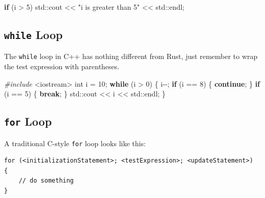 \documentclass[
]{book}
\newenvironment{Shaded}{\begin{snugshade}}{\end{snugshade}}
\newcommand{\BuiltInTok}[1]{#1}
\newcommand{\ControlFlowTok}[1]{\textcolor[rgb]{0.13,0.29,0.53}{\textbf{#1}}}
\newcommand{\DataTypeTok}[1]{\textcolor[rgb]{0.13,0.29,0.53}{#1}}
\newcommand{\DecValTok}[1]{\textcolor[rgb]{0.00,0.00,0.81}{#1}}
\newcommand{\ImportTok}[1]{#1}
\newcommand{\NormalTok}[1]{#1}
\newcommand{\PreprocessorTok}[1]{\textcolor[rgb]{0.56,0.35,0.01}{\textit{#1}}}
\newcommand{\StringTok}[1]{\textcolor[rgb]{0.31,0.60,0.02}{#1}}
\begin{document}
\begin{Shaded}
\begin{Highlighting}[]
\ControlFlowTok{if}\NormalTok{ (i \textgreater{} }\DecValTok{5}\NormalTok{)}
    \BuiltInTok{std::}\NormalTok{cout \textless{}\textless{} }\StringTok{"i is greater than 5"}\NormalTok{ \textless{}\textless{} }\BuiltInTok{std::}\NormalTok{endl;}
\end{Highlighting}
\end{Shaded}

\hypertarget{while-loop}{%
\subsection{\texorpdfstring{\texttt{while} Loop}{while Loop}}\label{while-loop}}

The \texttt{while} loop in C++ has nothing different from Rust, just remember to wrap the test expression with parentheses.

\begin{Shaded}
\begin{Highlighting}[]
\PreprocessorTok{\#include }\ImportTok{\textless{}iostream\textgreater{}}
\DataTypeTok{int}\NormalTok{ i = }\DecValTok{10}\NormalTok{;}
\ControlFlowTok{while}\NormalTok{ (i \textgreater{} }\DecValTok{0}\NormalTok{)}
\NormalTok{\{}
\NormalTok{    i{-}{-};}
    \ControlFlowTok{if}\NormalTok{ (i == }\DecValTok{8}\NormalTok{)}
\NormalTok{    \{}
        \ControlFlowTok{continue}\NormalTok{;}
\NormalTok{    \}}
    \ControlFlowTok{if}\NormalTok{ (i == }\DecValTok{5}\NormalTok{)}
\NormalTok{    \{}
        \ControlFlowTok{break}\NormalTok{;}
\NormalTok{    \}}
    \BuiltInTok{std::}\NormalTok{cout \textless{}\textless{} i \textless{}\textless{} }\BuiltInTok{std::}\NormalTok{endl;}
\NormalTok{\}}
\end{Highlighting}
\end{Shaded}

\hypertarget{for-loop}{%
\subsection{\texorpdfstring{\texttt{for} Loop}{for Loop}}\label{for-loop}}

A traditional C-style \texttt{for} loop looks like this:

\begin{verbatim}
for (<initializationStatement>; <testExpression>; <updateStatement>)
{
    // do something
}
\end{verbatim}
\end{document}
